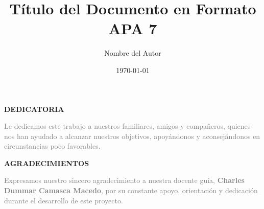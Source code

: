 \documentclass[12pt]{article} %
\title{Título del Documento en Formato APA 7}
\author{Nombre del Autor}
\date{\today}
\begin{document}
\imprimircaratula

\begin{center}
    \vspace*{3cm} 
    \normalsize \textbf{DEDICATORIA} 
    \vspace{6cm}
\end{center}
\hspace{7.9cm}
\begin{minipage}{\dimexpr\textwidth-8cm}
    \textcolor{gray}{
        Le dedicamos este trabajo a nuestros familiares, amigos y compañeros, 
        quienes nos han ayudado a alcanzar nuestros objetivos, apoyándonos y 
        aconsejándonos en circunstancias poco favorables.
    }
\end{minipage}

\newpage

\begin{center}
    \vspace*{3cm} 
    \normalsize \textbf{AGRADECIMIENTOS} 
    \vspace{6cm}
\end{center}
\hspace{7.9cm}
\begin{minipage}{\dimexpr\textwidth-8cm}
    \textcolor{gray}{
        Expresamos nuestro sincero agradecimiento a nuestra docente guía, \textbf{Charles Dummar Camasca Macedo}, por su constante apoyo, orientación y dedicación durante el desarrollo de este proyecto.
    }
\end{minipage}

\newpage

\tableofcontents
\newpage

\listoffigures
\newpage
\end{document}
